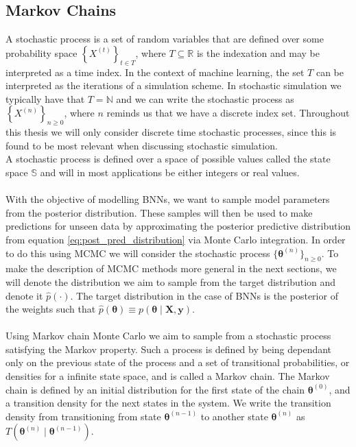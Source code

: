 \subsection{Markov Chains}\label{sec:basic_mc}
A stochastic process is a set of random variables that are defined over some probability space $\left\{X^{(t)} \right\}_{t\in T}$, where $T\subseteq \mathbb{R}$ is the indexation and may be interpreted as a time index. In the context of machine learning, the set $T$ can be interpreted as the iterations of a simulation scheme. In stochastic simulation we typically have that $T=\mathbb{N}$ and we can write the stochastic process as $\left\{X^{(n)}\right\}_{n\geq 0}$, where $n$ reminds us that we have a discrete index set. Throughout this thesis we will only consider discrete time stochastic processes, since this is found to be most relevant when discussing stochastic simulation. \\
A stochastic process is defined over a space of possible values called the state space $\mathbb{S}$ and will in most applications be either integers or real values. 
\\
\\
With the objective of modelling BNNs, we want to sample model parameters from the posterior distribution. These samples will then be used to make predictions for unseen data by approximating the posterior predictive distribution from equation \ref{eq:post_pred_distribution} via Monte Carlo integration. In order to do this using MCMC we will consider the stochastic process $\{\boldsymbol{\theta}^{(n)}\}_{n\geq 0}$. To make the description of MCMC methods more general in the next sections, we will denote the distribution we aim to sample from the target distribution and denote it $\hat{p}(\cdot)$. The target distribution in the case of BNNs is the posterior of the weights such that $\hat{p}(\boldsymbol{\theta})\equiv p(\boldsymbol{\theta}\mid \boldsymbol{X},\boldsymbol{y})$.
\\
\\
Using Markov chain Monte Carlo we aim to sample from a stochastic process satisfying the Markov property. Such a process is defined by being dependant only on the previous state of the process and a set of transitional probabilities, or densities for a infinite state space, and is called a Markov chain. The Markov chain is defined by an initial distribution for the first state of the chain $\boldsymbol{\theta}^{(0)}$, and a transition density for the next states in the system. We write the transition density from transitioning from state $\boldsymbol{\theta}^{(n-1)}$ to another state $\boldsymbol{\theta}^{(n)}$ as $T(\boldsymbol{\theta}^{(n)}\mid \boldsymbol{\theta}^{(n-1)})$. \\
